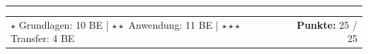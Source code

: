 \documentclass[11pt, a4paper]{article}
\newcommand{\maxpunkte}{25}
\begin{document}

\vfill
\hrule
\vspace{0.4em}

\begin{tabularx}{\linewidth}{X r}
\small\textcolor{mittelgrau}{$\star$ Grundlagen: 10 BE | $\star\star$ Anwendung: 11 BE | $\star\star\star$ Transfer: 4 BE} &
\textbf{Punkte:} \maxpunkte{} / \maxpunkte
\end{tabularx}
\end{document}
